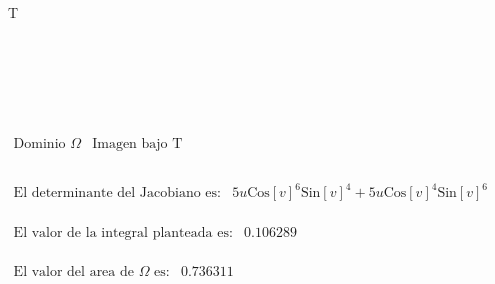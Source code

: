 \begin{doublespace}
{T \text{*)}}\\
\\
\\
\pmb{}\\
\\
\\
\)
\end{doublespace}

\begin{doublespace}
\noindent\(\begin{array}{cc}
 \text{Dominio $\Omega $} & \text{Imagen bajo T} \\
  &  \\
\end{array}\)
\end{doublespace}

\begin{doublespace}
\noindent\(\begin{array}{cc}
 \text{El determinante del Jacobiano es:} & 5 u \text{Cos}[v]^6 \text{Sin}[v]^4+5 u \text{Cos}[v]^4 \text{Sin}[v]^6 \\
\end{array}\)
\end{doublespace}

\begin{doublespace}
\noindent\(\begin{array}{cc}
 \text{El valor de la integral planteada es:} & 0.106289 \\
\end{array}\)
\end{doublespace}

\begin{doublespace}
\noindent\(\begin{array}{cc}
 \text{El valor del area de $\Omega $ es:} & 0.736311 \\
\end{array}\)
\end{doublespace}